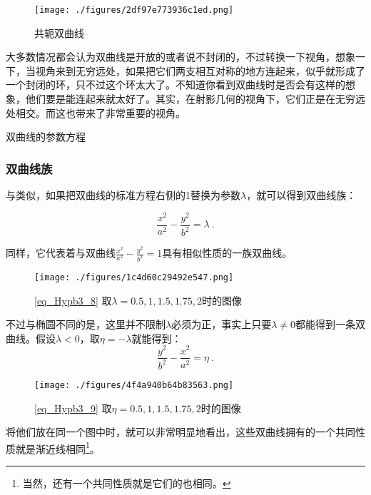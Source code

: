 \begin{figure}[ht]
\centering
\texttt{[image: ./figures/2df97e773936c1ed.png]}
\caption{共轭双曲线} \label{fig_Hypb3_8}
\end{figure}


大多数情况都会认为双曲线是开放的或者说不封闭的，不过转换一下视角，想象一下，当视角来到无穷远处，如果把它们两支相互对称的地方连起来，似乎就形成了一个封闭的环，只不过这个环太大了。不知道你看到双曲线时是否会有这样的想象，他们要是能连起来就太好了。其实，在射影几何的视角下，它们正是在无穷远处相交。而这也带来了非常重要的视角。

\begin{theorem}{双曲线的参数方程}

\end{theorem}
\subsubsection{双曲线族}

与类似，如果把双曲线的标准方程右侧的1替换为参数$\lambda$，就可以得到双曲线族：

\begin{equation}\label{eq_Hypb3_8}
\frac{x^2}{a^2} - \frac{y^2}{b^2} = \lambda~.
\end{equation}

同样，它代表着与双曲线$\displaystyle\frac{x^2}{a^2} - \frac{y^2}{b^2} = 1$具有相似性质的一族双曲线。

\begin{figure}[ht]
\centering
\texttt{[image: ./figures/1c4d60c29492e547.png]}
\caption{\autoref{eq_Hypb3_8} 取$\lambda=0.5,1,1.5,1.75,2$时的图像} \label{fig_Hypb3_5}
\end{figure}


不过与椭圆不同的是，这里并不限制$\lambda$必须为正，事实上只要$\lambda\neq0$都能得到一条双曲线。假设$\lambda<0$，取$\eta=-\lambda$就能得到：
\begin{equation}\label{eq_Hypb3_9}
\frac{y^2}{b^2}-\frac{x^2}{a^2} = \eta~.
\end{equation}
\begin{figure}[ht]
\centering
\texttt{[image: ./figures/4f4a940b64b83563.png]}
\caption{\autoref{eq_Hypb3_9} 取$\eta=0.5,1,1.5,1.75,2$时的图像} \label{fig_Hypb3_6}
\end{figure}

将他们放在同一个图中时，就可以非常明显地看出，这些双曲线拥有的一个共同性质就是渐近线相同\footnote{当然，还有一个共同性质就是它们的也相同。}。

